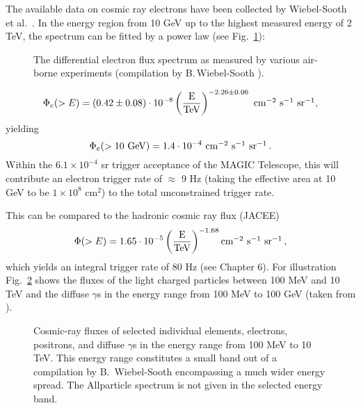The available data on cosmic ray
electrons have been collected by Wiebel-Sooth et al.\ \cite{wiebel:94}.
In the energy region from 10 GeV up to the highest measured energy of 2 TeV,
the spectrum can be fitted by a power law (see Fig.~\ref{fig-electrons}):

\begin{figure}[htb]
\begin{center}
\caption{The differential electron flux spectrum as
measured by various air-borne experiments (compilation by B.\,Wiebel-Sooth
\cite{wiebel:94}).}
\label{fig-electrons}
\end{center}
\end{figure}

\[
\Phi _{e}(>E)=(0.42\pm 0.08)\cdot 10^{-8}\left( \frac{{\rm E}}{{\rm TeV}}%
\right) ^{-2.26\pm 0.06}\ \mbox{cm$^{-2}$ s$^{-1}$ sr$^{-1}$},
\]
yielding 
\[
\Phi _{e}(>10\ {\rm GeV})=1.4\cdot 10^{-4}\ \mbox{cm$^{-2}$ s$^{-1}$ sr$^{-1}$}\,. 
\]
Within the $6.1\times 10^{-4}$ sr trigger acceptance of the MAGIC Telescope,
this will contribute an electron trigger rate of $\approx$ 9 Hz (taking the effective
area at 10 GeV to be $1\times 10^{8}$ cm$^{2}$) to the total unconstrained
trigger rate.

This can be compared to the hadronic cosmic ray flux (JACEE) 
\[
\Phi (>E)=1.65\cdot 10^{-5}\left( \frac{{\rm E}}{{\rm TeV}}\right) ^{-1.68}%
\mbox{cm$^{-2}$ s$^{-1}$ sr$^{-1}$}\,, 
\]
which yields an integral trigger rate of 80 Hz (see Chapter 6).
For illustration
Fig.~\ref{fig-all_flux} shows the fluxes of the light charged particles
between 100 MeV and 10 TeV
and the diffuse $\gamma$s in the energy range from 100 MeV to 100 GeV
(taken from \cite{wiebel:98}).
\begin{figure}
\leavevmode
\centering
\epsfxsize=15cm
\caption{\label{fig-all_flux}
Cosmic-ray fluxes of selected
individual elements, electrons, positrons, and
diffuse $\gamma$s in the energy range from 100 MeV to 10 TeV.
This energy range constitutes a small band out of a 
compilation
by B.\, Wiebel-Sooth \cite{wiebel:98}
encompassing a much wider energy spread. The Allparticle spectrum
is not given in the selected energy band.}
\end{figure}


